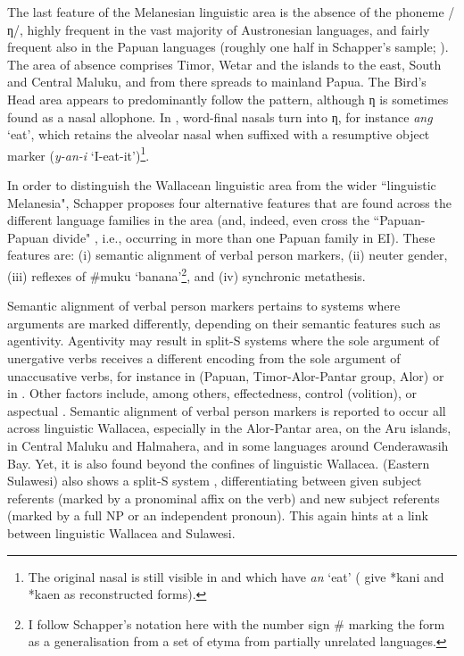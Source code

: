 The last feature of the Melanesian linguistic area is the absence of the phoneme /ƞ/, highly frequent in the vast majority of Austronesian languages, and fairly frequent also in the Papuan languages (roughly one half in Schapper's sample; \citealt[116]{schapper2015wallacea}). The area of absence comprises Timor, Wetar and the islands to the east, South and Central Maluku, and from there spreads to mainland Papua. The Bird's Head area appears to predominantly follow the pattern, although ƞ is sometimes found as a nasal allophone. In , word-final nasals turn into ƞ, for instance \textit{ang} `eat', which retains the alveolar nasal when suffixed with a resumptive object marker (\textit{y-an-i} `I-eat-it')\footnote{The original nasal is still visible in  and  which have \textit{an} `eat' (\citealt{ross2008lexicon} give  *kani and  *kaen as reconstructed forms).}.

In order to distinguish the Wallacean linguistic area from the wider ``linguistic Melanesia", Schapper proposes four alternative features that are found across the different language families in the area (and, indeed, even cross the ``Papuan-Papuan divide" \citep[124]{schapper2015wallacea}, i.e., occurring in more than one Papuan family in EI). These features are: (i) semantic alignment of verbal person markers, (ii) neuter gender, (iii) reflexes of \#muku `banana'\footnote{I follow Schapper's notation here with the number sign \# marking the form as a generalisation from a set of etyma from partially unrelated languages.}, and (iv) synchronic metathesis.

Semantic alignment of verbal person markers pertains to systems where arguments are marked differently, depending on their semantic features such as agentivity. Agentivity may result in split-S systems where the sole argument of unergative verbs receives a different encoding from the sole argument of unaccusative verbs, for instance in  (Papuan, Timor-Alor-Pantar group, Alor) or in . Other factors include, among others, effectedness, control (volition), or aspectual \citep[125]{schapper2015wallacea}. Semantic alignment of verbal person markers is reported to occur all across linguistic Wallacea, especially in the Alor-Pantar area, on the Aru islands, in Central Maluku and Halmahera, and in some languages around Cenderawasih Bay. Yet, it is also found beyond the confines of linguistic Wallacea.  (Eastern Sulawesi) also shows a split-S system \citep{Barsel1994}, differentiating between given subject referents (marked by a pronominal affix on the verb) and new subject referents (marked by a full NP or an independent pronoun). This again hints at a link between linguistic Wallacea and Sulawesi.

